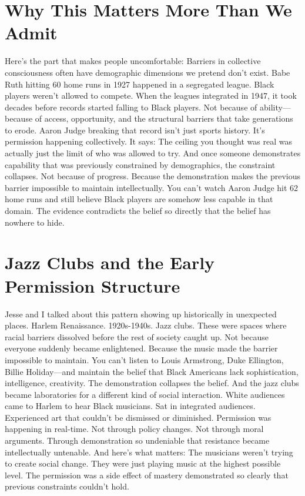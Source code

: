 \documentclass[12pt,openany]{book}
\begin{document}
\section{Why This Matters More Than We Admit}

Here's the part that makes people uncomfortable:
Barriers in collective consciousness often have demographic dimensions we pretend don't exist.
Babe Ruth hitting 60 home runs in 1927 happened in a segregated league. Black players weren't allowed to compete.
When the leagues integrated in 1947, it took decades before records started falling to Black players. Not because of ability—because of access, opportunity, and the structural barriers that take generations to erode.
Aaron Judge breaking that record isn't just sports history. It's permission happening collectively.
It says: The ceiling you thought was real was actually just the limit of who was allowed to try.
And once someone demonstrates capability that was previously constrained by demographics, the constraint collapses. Not because of progress. Because the demonstration makes the previous barrier impossible to maintain intellectually.
You can't watch Aaron Judge hit 62 home runs and still believe Black players are somehow less capable in that domain.
The evidence contradicts the belief so directly that the belief has nowhere to hide.

\section{Jazz Clubs and the Early Permission Structure}

Jesse and I talked about this pattern showing up historically in unexpected places.
Harlem Renaissance. 1920s-1940s. Jazz clubs.
These were spaces where racial barriers dissolved before the rest of society caught up. Not because everyone suddenly became enlightened. Because the music made the barrier impossible to maintain.
You can't listen to Louis Armstrong, Duke Ellington, Billie Holiday—and maintain the belief that Black Americans lack sophistication, intelligence, creativity.
The demonstration collapses the belief.
And the jazz clubs became laboratories for a different kind of social interaction. White audiences came to Harlem to hear Black musicians. Sat in integrated audiences. Experienced art that couldn't be dismissed or diminished.
Permission was happening in real-time.
Not through policy changes. Not through moral arguments. Through demonstration so undeniable that resistance became intellectually untenable.
And here's what matters:
The musicians weren't trying to create social change. They were just playing music at the highest possible level. The permission was a side effect of mastery demonstrated so clearly that previous constraints couldn't hold.
\end{document}

